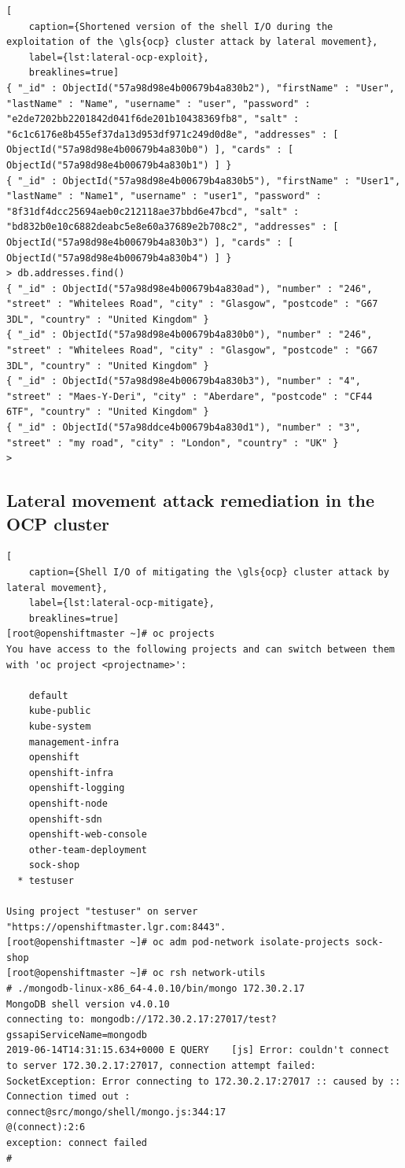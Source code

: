 \begin{lstlisting}[
	caption={Shortened version of the shell I/O during the exploitation of the \gls{ocp} cluster attack by lateral movement},
	label={lst:lateral-ocp-exploit},
	breaklines=true]
{ "_id" : ObjectId("57a98d98e4b00679b4a830b2"), "firstName" : "User", "lastName" : "Name", "username" : "user", "password" : "e2de7202bb2201842d041f6de201b10438369fb8", "salt" : "6c1c6176e8b455ef37da13d953df971c249d0d8e", "addresses" : [ ObjectId("57a98d98e4b00679b4a830b0") ], "cards" : [ ObjectId("57a98d98e4b00679b4a830b1") ] }
{ "_id" : ObjectId("57a98d98e4b00679b4a830b5"), "firstName" : "User1", "lastName" : "Name1", "username" : "user1", "password" : "8f31df4dcc25694aeb0c212118ae37bbd6e47bcd", "salt" : "bd832b0e10c6882deabc5e8e60a37689e2b708c2", "addresses" : [ ObjectId("57a98d98e4b00679b4a830b3") ], "cards" : [ ObjectId("57a98d98e4b00679b4a830b4") ] }
> db.addresses.find()
{ "_id" : ObjectId("57a98d98e4b00679b4a830ad"), "number" : "246", "street" : "Whitelees Road", "city" : "Glasgow", "postcode" : "G67 3DL", "country" : "United Kingdom" }
{ "_id" : ObjectId("57a98d98e4b00679b4a830b0"), "number" : "246", "street" : "Whitelees Road", "city" : "Glasgow", "postcode" : "G67 3DL", "country" : "United Kingdom" }
{ "_id" : ObjectId("57a98d98e4b00679b4a830b3"), "number" : "4", "street" : "Maes-Y-Deri", "city" : "Aberdare", "postcode" : "CF44 6TF", "country" : "United Kingdom" }
{ "_id" : ObjectId("57a98ddce4b00679b4a830d1"), "number" : "3", "street" : "my road", "city" : "London", "country" : "UK" }
>
\end{lstlisting}

\subsection{Lateral movement attack remediation in the OCP cluster}
\begin{lstlisting}[
	caption={Shell I/O of mitigating the \gls{ocp} cluster attack by lateral movement},
	label={lst:lateral-ocp-mitigate},
	breaklines=true]
[root@openshiftmaster ~]# oc projects
You have access to the following projects and can switch between them with 'oc project <projectname>':

    default
    kube-public
    kube-system
    management-infra
    openshift
    openshift-infra
    openshift-logging
    openshift-node
    openshift-sdn
    openshift-web-console
    other-team-deployment
    sock-shop
  * testuser

Using project "testuser" on server "https://openshiftmaster.lgr.com:8443".
[root@openshiftmaster ~]# oc adm pod-network isolate-projects sock-shop
[root@openshiftmaster ~]# oc rsh network-utils
# ./mongodb-linux-x86_64-4.0.10/bin/mongo 172.30.2.17
MongoDB shell version v4.0.10
connecting to: mongodb://172.30.2.17:27017/test?gssapiServiceName=mongodb
2019-06-14T14:31:15.634+0000 E QUERY    [js] Error: couldn't connect to server 172.30.2.17:27017, connection attempt failed: SocketException: Error connecting to 172.30.2.17:27017 :: caused by :: Connection timed out :
connect@src/mongo/shell/mongo.js:344:17
@(connect):2:6
exception: connect failed
#
\end{lstlisting}

